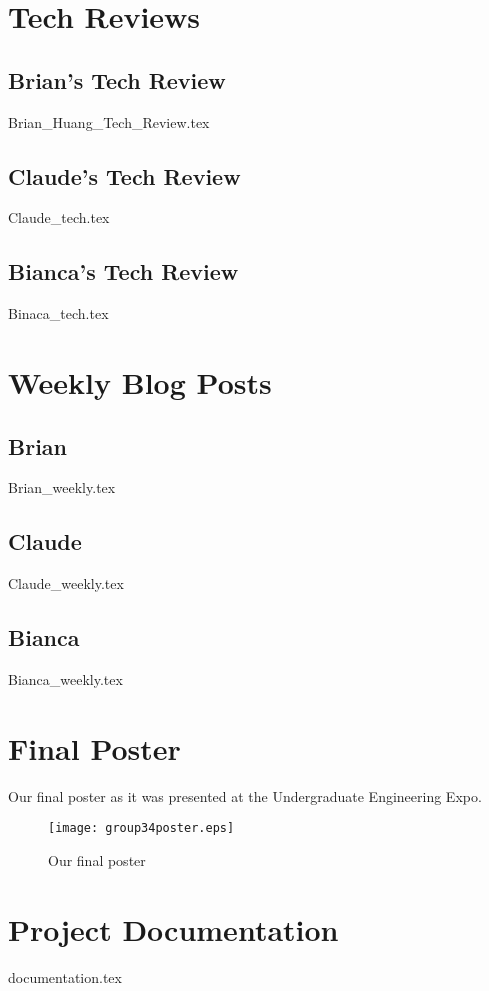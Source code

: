\documentclass[onecolumn, draftclsnofoot,10pt, compsoc]{IEEEtran}
\begin{document}
	\section{Tech Reviews}
	\subsection{Brian's Tech Review}
	{Brian_Huang_Tech_Review.tex}
	\subsection{Claude's Tech Review}
	{Claude_tech.tex}
	\subsection{Bianca's Tech Review}
	{Binaca_tech.tex}
	
	\section{Weekly Blog Posts}
	
	\subsection{Brian}
	{Brian_weekly.tex}
	
	\subsection{Claude}
	{Claude_weekly.tex}
	
	\subsection{Bianca}
	{Bianca_weekly.tex}
	\newpage
	\section{Final Poster}	
		Our final poster as it was presented at the Undergraduate Engineering Expo. 	
		\begin{figure}[!hb]
			\centering
			\texttt{[image: group34poster.eps]}
			\caption{Our final poster}
		\end{figure}

	\section{Project Documentation}
	{documentation.tex}
	
\end{document}
